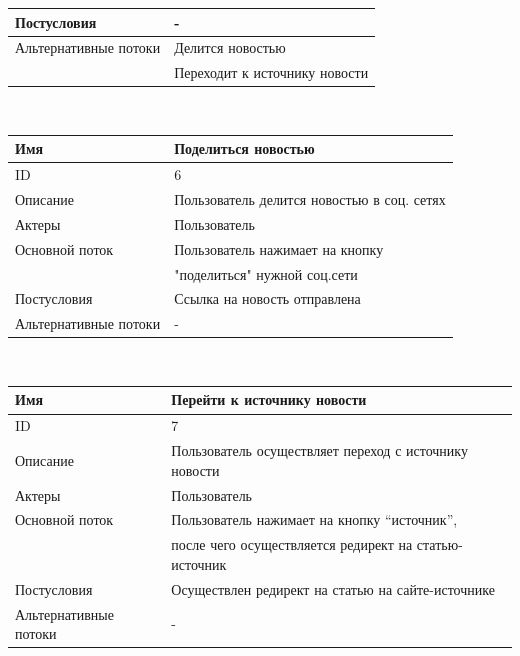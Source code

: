 \begin{center}
\begin{tabular}{|l|l|}
        \hline
        Постусловия           & -                                            \\
        \hline
        Альтернативные потоки & Делится новостью                             \\
        & Переходит к источнику новости                \\
        \hline
    \end{tabular}\\
    \vspace{0.5cm}
    \begin{tabular}{|l|l|}
        \hline
        Имя                   & Поделиться новостью                        \\
        \hline
        ID                    & 6                                          \\
        \hline
        Описание              & Пользователь делится новостью в соц. сетях \\
        \hline
        Актеры                & Пользователь                               \\
        \hline
        Основной поток        & Пользователь нажимает на кнопку            \\
        & "поделиться" нужной соц.сети               \\
        \hline
        Постусловия           & Ссылка на новость отправлена               \\
        \hline
        Альтернативные потоки & -                                          \\
        \hline
    \end{tabular}\\
    \vspace{0.8cm}
    \begin{tabular}{|l|l|}
        \hline
        Имя                   & Перейти к источнику новости                           \\
        \hline
        ID                    & 7                                                     \\
        \hline
        Описание              & Пользователь осуществляет переход с источнику новости \\
        \hline
        Актеры                & Пользователь                                          \\
        \hline
        Основной поток        & Пользователь нажимает на кнопку “источник”,           \\
        & после чего осуществляется редирект на статью-источник \\
        \hline
        Постусловия           & Осуществлен редирект на статью на сайте-источнике     \\
        \hline
        Альтернативные потоки & -                                                     \\
        \hline
    \end{tabular}
\end{center}
